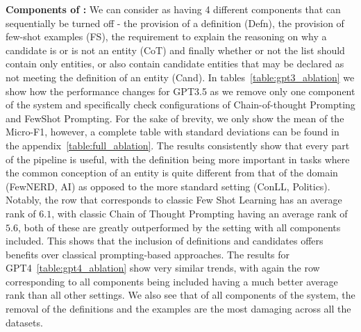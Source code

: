 \documentclass[11pt]{article}
\begin{document}
\noindent\textbf{Components of \toolname:} We can consider \toolname as having 4 different components that can sequentially be turned off - the provision of a definition (Defn), the provision of few-shot examples (FS), the requirement to explain the reasoning on why a candidate is or is not an entity (CoT) and finally whether or not the list should contain only entities, or also contain candidate entities that may be declared as not meeting the definition of an entity (Cand). In tables~\ref{table:gpt3_ablation} we show how the performance changes for GPT3.5 as we remove only one component of the system and specifically check configurations of Chain-of-thought Prompting and FewShot Prompting. For the sake of brevity, we only show the mean of the Micro-F1, however, a complete table with standard deviations can be found in the appendix~\ref{table:full_ablation}. The results consistently show that every part of the pipeline is useful, with the definition being more important in tasks where the common conception of an entity is quite different from that of the domain (FewNERD, AI) as opposed to the more standard setting (ConLL, Politics). Notably, the row that corresponds to classic Few Shot Learning has an average rank of $6.1$, with classic Chain of Thought Prompting having an average rank of $5.6$, both of these are greatly outperformed by the setting with all components included. This shows that the inclusion of definitions and candidates offers benefits over classical prompting-based approaches. 
The results for GPT4~\ref{table:gpt4_ablation} show very similar trends, with again the row corresponding to all components being included having a much better average rank than all other settings. We also see that of all components of the system, the removal of the definitions and the examples are the most damaging across all the datasets.  
\end{document}
